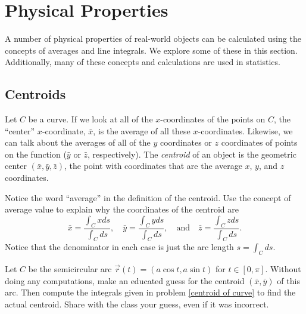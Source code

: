 \section{Physical Properties}
%

A number of physical properties of real-world objects can be calculated using the concepts of averages and line integrals.  We explore some of these in this section.  Additionally, many of these concepts and calculations are used in statistics.

\subsection{Centroids}%

\begin{definition}[Centroid]
  Let $C$ be a curve. If we look at all of the $x$-coordinates of the points on $C$, the ``center'' $x$-coordinate, $\bar x$, is the average of all these $x$-coordinates.  Likewise, we can talk about the averages of all of the $y$ coordinates or $z$ coordinates of points on the function ($\bar y$ or $\bar z$, respectively).  The \emph{centroid} of an object is the geometric center $(\bar x, \bar y, \bar z)$, the point with coordinates that are the average $x$, $y$, and $z$ coordinates.
\end{definition}

\begin{problem}[Centroid]\label{centroid of curve}%
  Notice the word ``average'' in the definition of the centroid. Use the concept of average value to explain why the coordinates of the centroid are %
$$
\bar x = \frac{\int_C x ds}{\int_C  ds},\quad
\bar y = \frac{\int_C y ds}{\int_C  ds},\quad 
\text{and}\quad
\bar z = \frac{\int_C z ds}{\int_C  ds}.
$$
Notice that the denominator in each case is just the arc length $s=\int_C ds$. 
\end{problem}


\begin{problem}\label{semicircle centroid}
 Let $C$ be the semicircular arc $\vec r(t)=(a\cos t, a\sin t)$ for $t\in[0,\pi]$. Without doing any computations, make an educated guess for the centroid $(\bar x, \bar y)$ of this arc.  Then compute the integrals given in problem \ref{centroid of curve} to find the actual centroid. Share with the class your guess, even if it was incorrect. 
\end{problem}

